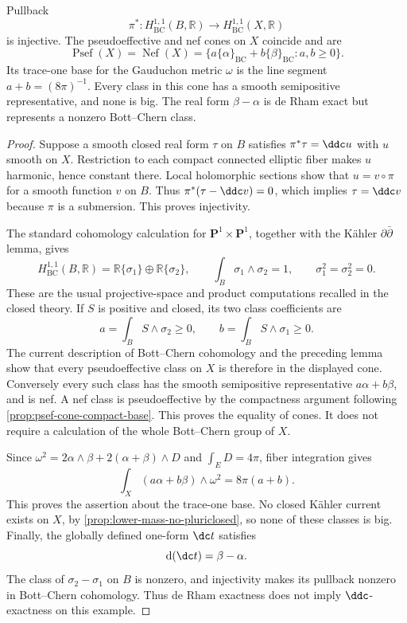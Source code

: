 \begin{proposition}\label{prop:elliptic-bott-chern-cones}
Pullback
\[
 \pi^*:H^{1,1}_{\mathrm{BC}}(B,\mathbb R)
           \longrightarrow H^{1,1}_{\mathrm{BC}}(X,\mathbb R)
\]
is injective. The pseudoeffective and nef cones on $X$ coincide and are
\[
 \operatorname{Psef}(X)=\operatorname{Nef}(X)
 =\{a\{\alpha\}_{\mathrm{BC}}+b\{\beta\}_{\mathrm{BC}}:
                                           a,b\geq0\}.
\]
Its trace-one base for the Gauduchon metric $\omega$ is the line segment $a+b=(8\pi)^{-1}$. Every class in this cone has a smooth semipositive representative, and none is big. The real form $\beta-\alpha$ is de Rham exact but represents a nonzero Bott--Chern class.
\end{proposition}
\begin{proof}
Suppose a smooth closed real form $\tau$ on $B$ satisfies $\pi^*\tau=\ddc u$ with $u$ smooth on $X$. Restriction to each compact connected elliptic fiber makes $u$ harmonic, hence constant there. Local holomorphic sections show that $u=v\circ\pi$ for a smooth function $v$ on $B$. Thus $\pi^*(\tau-\ddc v)=0$, which implies $\tau=\ddc v$ because $\pi$ is a submersion. This proves injectivity.

The standard cohomology calculation for $\mathbf P^1\times\mathbf P^1$, together with the K\"ahler $\partial\bar\partial$ lemma, gives
\[
 H^{1,1}_{\mathrm{BC}}(B,\mathbb R)
       =\mathbb R\{\sigma_1\}\oplus\mathbb R\{\sigma_2\},
 \qquad \int_B\sigma_1\wedge\sigma_2=1,
 \qquad \sigma_1^2=\sigma_2^2=0.
\]
These are the usual projective-space and product computations recalled in the closed theory. If $S$ is positive and closed, its two class coefficients are
\[
 a=\int_BS\wedge\sigma_2\geq0,
 \qquad b=\int_BS\wedge\sigma_1\geq0.
\]
The current description of Bott--Chern cohomology and the preceding lemma show that every pseudoeffective class on $X$ is therefore in the displayed cone. Conversely every such class has the smooth semipositive representative $a\alpha+b\beta$, and is nef. A nef class is pseudoeffective by the compactness argument following \cref{prop:psef-cone-compact-base}. This proves the equality of cones. It does not require a calculation of the whole Bott--Chern group of $X$.

Since $\omega^2=2\alpha\wedge\beta+2(\alpha+\beta)\wedge D$ and $\int_E D=4\pi$, fiber integration gives
\[
 \int_X(a\alpha+b\beta)\wedge\omega^2=8\pi(a+b).
\]
This proves the assertion about the trace-one base. No closed K\"ahler current exists on $X$, by \cref{prop:lower-mass-no-pluriclosed}, so none of these classes is big. Finally, the globally defined one-form $\dc t$ satisfies
\[
 \mathrm{d}(\dc t)=\beta-\alpha.
\]
The class of $\sigma_2-\sigma_1$ on $B$ is nonzero, and injectivity makes its pullback nonzero in Bott--Chern cohomology. Thus de Rham exactness does not imply $\ddc$-exactness on this example.
\end{proof}

